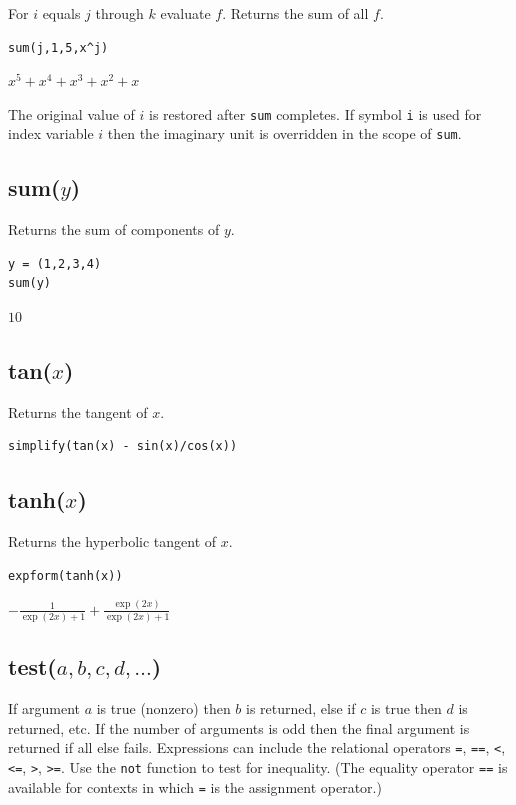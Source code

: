 \documentclass[12pt]{article}
\begin{document}
For $i$ equals $j$ through $k$ evaluate $f$.
Returns the sum of all $f$.

{\color{blue}
\begin{verbatim}
sum(j,1,5,x^j)
\end{verbatim}
}

\noindent
$\displaystyle x^5+x^4+x^3+x^2+x$

\bigskip
\noindent
The original value of $i$ is restored after {\tt sum} completes.
If symbol {\tt i} is used for index variable $i$
then the imaginary unit is overridden in the scope of {\tt sum}.

\subsection*{sum($y$)}

Returns the sum of components of $y$.

{\color{blue}
\begin{verbatim}
y = (1,2,3,4)
sum(y)
\end{verbatim}
}

\noindent
$10$

\subsection*{tan($x$)}

Returns the tangent of $x$.

{\color{blue}
\begin{verbatim}
simplify(tan(x) - sin(x)/cos(x))
\end{verbatim}
}


\subsection*{tanh($x$)}

Returns the hyperbolic tangent of $x$.

{\color{blue}
\begin{verbatim}
expform(tanh(x))
\end{verbatim}
}

\noindent
$\displaystyle -\frac{1}{\exp(2x)+1}+\frac{\exp(2x)}{\exp(2x)+1}$

\subsection*{test($a,b,c,d,\ldots$)}

If argument $a$ is true (nonzero) then $b$ is returned, else if $c$ is true then $d$ is returned, etc.
If the number of arguments is odd then the final argument is returned if all else fails.
Expressions can include the relational operators
\verb$=$,
\verb$==$,
\verb$<$,
\verb$<=$,
\verb$>$,
\verb$>=$.
Use the
\verb$not$
function to test for inequality.
(The equality operator
\verb$==$
is available for contexts in which
\verb$=$
is the assignment operator.)
\end{document}
